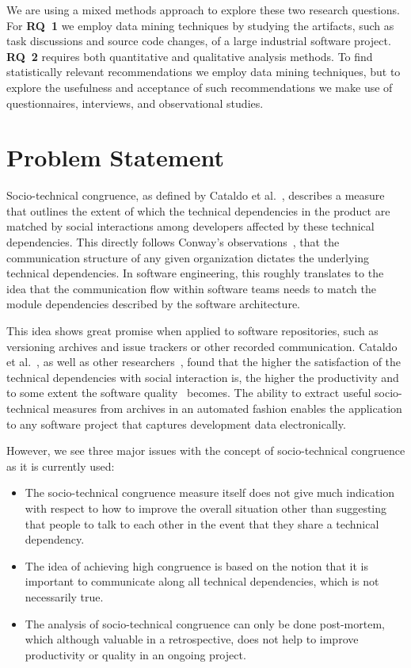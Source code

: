 We are using a mixed methods approach to explore these two research questions.
For \textbf{RQ~1} we employ data mining techniques by studying the artifacts, such as task discussions and source code changes, of a large industrial software project.
\textbf{RQ~2} requires both quantitative and qualitative analysis methods.
To find statistically relevant recommendations we employ data mining techniques, but to explore the usefulness and acceptance of such recommendations we make use of questionnaires, interviews, and observational studies.

\section{Problem Statement}
Socio-technical congruence, as defined by Cataldo et al.~\cite{cataldo:cscw:2006}, describes a measure that outlines the extent of which the technical dependencies in the product are matched by social interactions among developers affected by these technical dependencies.
This directly follows Conway's observations~\cite{conway:datamination:1968}, that the communication structure of any given organization dictates the underlying technical dependencies.
In software engineering, this roughly translates to the idea that the communication flow within software teams needs to match the module dependencies described by the software architecture. 
 
This idea shows great promise when applied to software repositories, such as versioning archives and issue trackers or other recorded communication.
Cataldo et al.~\cite{cataldo:cscw:2006,cataldo:esem:2008}, as well as other researchers~\cite{valetto:msr:2007,ehrlich:stc:2008}, found that the higher the satisfaction of the technical dependencies with social interaction is, the higher the productivity and to some extent the software quality~\cite{kwan:tse:2011,bird:issre:2009,kwan:stc:2009} becomes.
The ability to extract useful socio-technical measures from archives in an automated fashion enables the application to any software project that captures development data electronically.

However, we see three major issues with the concept of socio-technical congruence as it is currently used:
\begin{itemize}
\item The socio-technical congruence measure itself does not give much indication with respect to how to improve the overall situation other than suggesting that people to talk to each other in the event that they share a technical dependency. 
\item The idea of achieving high congruence is based on the notion that it is important to communicate along all technical dependencies, which is not necessarily true.
\item The analysis of socio-technical congruence can only be done post-mortem, which although valuable in a retrospective, does not help to improve productivity or quality in an ongoing project.
\end{itemize}

